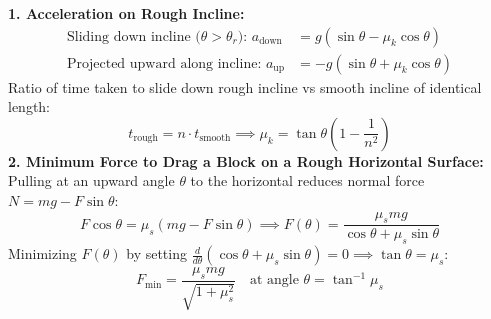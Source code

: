 \documentclass[10pt,a4paper]{article}
\begin{document}
\begin{formulabox}
\textbf{1. Acceleration on Rough Incline:}
\begin{align}
  \text{Sliding down incline ($\theta > \theta_r$): } a_{\text{down}} &= g(\sin\theta - \mu_k\cos\theta) \\
  \text{Projected upward along incline: } a_{\text{up}} &= -g(\sin\theta + \mu_k\cos\theta)
\end{align}
Ratio of time taken to slide down rough incline vs smooth incline of identical length:
\begin{equation}
  t_{\text{rough}} = n \cdot t_{\text{smooth}} \implies \mu_k = \tan\theta\left(1 - \frac{1}{n^2}\right)
\end{equation}
\textbf{2. Minimum Force to Drag a Block on a Rough Horizontal Surface:}
Pulling at an upward angle $\theta$ to the horizontal reduces normal force $N = mg - F\sin\theta$:
\begin{equation}
  F\cos\theta = \mu_s(mg - F\sin\theta) \implies F(\theta) = \frac{\mu_s mg}{\cos\theta + \mu_s\sin\theta}
\end{equation}
Minimizing $F(\theta)$ by setting $\frac{d}{d\theta}(\cos\theta + \mu_s\sin\theta) = 0 \implies \tan\theta = \mu_s$:
\begin{equation}
  F_{\min} = \frac{\mu_s mg}{\sqrt{1 + \mu_s^2}} \quad \text{at angle } \theta = \tan^{-1}\mu_s
\end{equation}
\end{formulabox}
\end{document}
